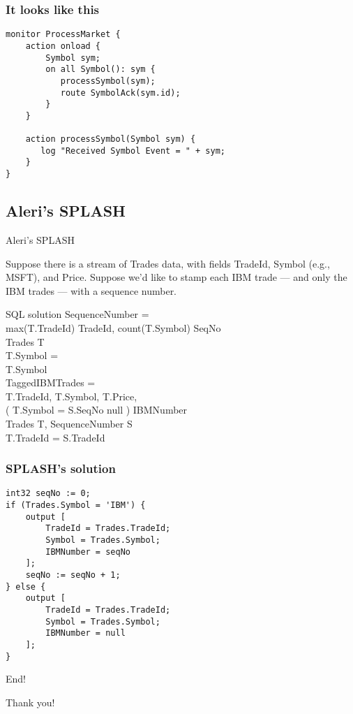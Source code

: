 \documentclass[brown, compress, mathserif]{beamer}
\begin{document}
\begin{frame}[fragile]
  \frametitle{It looks like this}

  \begin{verbatim}
monitor ProcessMarket {
    action onload {
        Symbol sym;
        on all Symbol(): sym {
           processSymbol(sym);
           route SymbolAck(sym.id);
        }
    }

    action processSymbol(Symbol sym) {
       log "Received Symbol Event = " + sym;
    }
}
\end{verbatim}

\end{frame}

\subsection{Aleri's SPLASH}

\begin{frame}{Aleri's SPLASH}
  \begin{example}
    Suppose there is a stream of Trades data, with fields TradeId, Symbol
(e.g., MSFT), and Price. Suppose we'd like to stamp each IBM trade --- and only the IBM
trades --- with a sequence number.
  \end{example}
\end{frame}


\begin{frame}{SQL solution}
SequenceNumber =\\
  max(T.TradeId)  TradeId, count(T.Symbol)  SeqNo\\
  Trades T\\
  T.Symbol = \\
  T.Symbol\\
\vspace{10 mm}
TaggedIBMTrades =\\
  T.TradeId, T.Symbol, T.Price,\\
   ( T.Symbol =   S.SeqNo  null )  IBMNumber\\
  Trades T, SequenceNumber S\\
  T.TradeId = S.TradeId
\end{frame}


\begin{frame}[fragile]
  \frametitle{SPLASH's solution}
\begin{verbatim}
int32 seqNo := 0;
if (Trades.Symbol = 'IBM') {
    output [
        TradeId = Trades.TradeId;
        Symbol = Trades.Symbol;
        IBMNumber = seqNo
    ];
    seqNo := seqNo + 1;
} else {
    output [
        TradeId = Trades.TradeId;
        Symbol = Trades.Symbol;
        IBMNumber = null
    ];
}

\end{verbatim}
\end{frame}

\begin{frame}{End!}
  \begin{center}
    Thank you!
  \end{center}
\end{frame}
\end{document}
